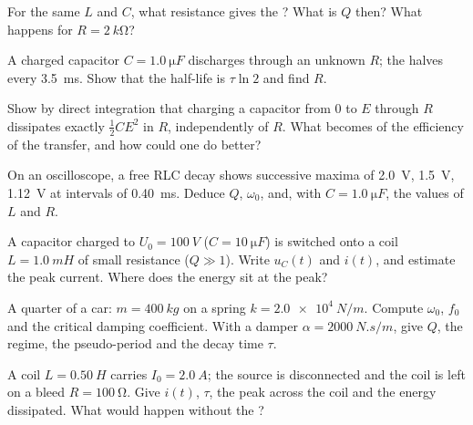 \begin{exercise}[$\star$]\label{exo:b1:transient-regimes:4}
For the same $L$ and $C$, what resistance gives the ?
What is $Q$ then? What happens for $R = \qty{2}{k\ohm}$?
\end{exercise}

\begin{exercise}[$\star\star$]\label{exo:b1:transient-regimes:5}
A charged capacitor $C = \qty{1.0}{\micro F}$ discharges through an
unknown $R$; the  halves every \qty{3.5}{ms}. Show that the
half-life is $\tau\ln 2$ and find $R$.
\end{exercise}

\begin{exercise}[$\star\star$]\label{exo:b1:transient-regimes:6}
Show by direct integration that charging a capacitor from $0$ to $E$
through $R$ dissipates exactly $\tfrac12 CE^2$ in $R$, independently of
$R$. What becomes of the efficiency of the transfer, and how could one
do better?
\end{exercise}

\begin{exercise}[$\star\star$]\label{exo:b1:transient-regimes:7}
On an oscilloscope, a free RLC decay shows successive maxima of
\qty{2.0}{V}, \qty{1.5}{V}, \qty{1.12}{V} at intervals of \qty{0.40}{ms}.
Deduce $Q$, $\omega_0$, and, with $C = \qty{1.0}{\micro F}$, the values
of $L$ and $R$.
\end{exercise}

\begin{exercise}[$\star\star$]\label{exo:b1:transient-regimes:8}
A capacitor charged to $U_0 = \qty{100}{V}$ ($C = \qty{10}{\micro F}$) is
switched onto a coil $L = \qty{1.0}{mH}$ of small resistance ($Q \gg 1$).
Write $u_C(t)$ and $i(t)$, and estimate the peak current. Where does
the energy sit at the peak?
\end{exercise}

\begin{exercise}[$\star\star$]\label{exo:b1:transient-regimes:9}
A quarter of a car: $m = \qty{400}{kg}$ on a spring $k = \qty{2.0e4}{N/m}$.
Compute $\omega_0$, $f_0$ and the critical damping coefficient. With a
damper $\alpha = \qty{2000}{N.s/m}$, give $Q$, the regime, the
pseudo-period and the decay time $\tau$.
\end{exercise}

\begin{exercise}[$\star\star\star$]\label{exo:b1:transient-regimes:10}
A coil $L = \qty{0.50}{H}$ carries $I_0 = \qty{2.0}{A}$; the source is
disconnected and the coil is left on a bleed  $R = \qty{100}{\ohm}$.
Give $i(t)$, $\tau$, the peak  across the coil and the energy
dissipated. What would happen without the ?
\end{exercise}

